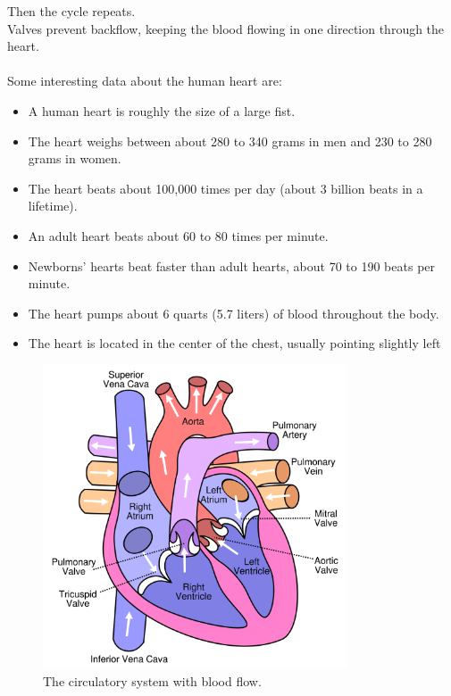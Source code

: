 Then the cycle repeats.\\
Valves prevent backflow, keeping the blood flowing in one direction through the heart.\\
\\
Some interesting data about the human heart are:
\begin{itemize}
	\item A human heart is roughly the size of a large fist.
	\item The heart weighs between about 280 to 340 grams in men and 230 to 280 grams in women.
	\item The heart beats about 100,000 times per day (about 3 billion beats in a lifetime).
	\item An adult heart beats about 60 to 80 times per minute.
	\item Newborns' hearts beat faster than adult hearts, about 70 to 190 beats per minute.
	\item The heart pumps about 6 quarts (5.7 liters) of blood throughout the body.
	\item The heart is located in the center of the chest, usually pointing slightly left
\end{itemize}
\begin{figure}[ht!]
	\centering
	\includegraphics[width=90mm]{figures/ch2/2.png}
	\caption{The circulatory system with blood flow.}
	\label{fig2.2}
\end{figure}

